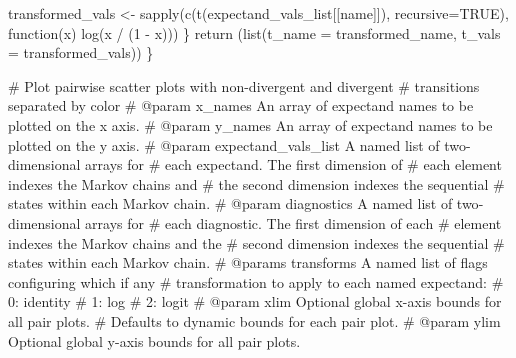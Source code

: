 \documentclass[
  letterpaper,
  DIV=11,
  numbers=noendperiod]{scrartcl}
\newenvironment{Shaded}{\begin{snugshade}}{\end{snugshade}}
\newcommand{\BuiltInTok}[1]{\textcolor[rgb]{0.00,0.23,0.31}{#1}}
\newcommand{\CommentTok}[1]{\textcolor[rgb]{0.37,0.37,0.37}{#1}}
\newcommand{\ControlFlowTok}[1]{\textcolor[rgb]{0.00,0.23,0.31}{#1}}
\newcommand{\DecValTok}[1]{\textcolor[rgb]{0.68,0.00,0.00}{#1}}
\newcommand{\NormalTok}[1]{\textcolor[rgb]{0.00,0.23,0.31}{#1}}
\newcommand{\OperatorTok}[1]{\textcolor[rgb]{0.37,0.37,0.37}{#1}}
\newcommand{\StringTok}[1]{\textcolor[rgb]{0.13,0.47,0.30}{#1}}
\begin{document}
\begin{Shaded}
\begin{Highlighting}[]
\NormalTok{    transformed\_vals }\OperatorTok{\textless{}{-}}\NormalTok{ sapply(c(t(expectand\_vals\_list[[name]]),}
\NormalTok{                                 recursive}\OperatorTok{=}\NormalTok{TRUE),}
\NormalTok{                               function(x) log(x }\OperatorTok{/}\NormalTok{ (}\DecValTok{1} \OperatorTok{{-}}\NormalTok{ x)))}
\NormalTok{  \}}
  \ControlFlowTok{return}\NormalTok{ (}\BuiltInTok{list}\NormalTok{(}\StringTok{\textquotesingle{}t\_name\textquotesingle{}} \OperatorTok{=}\NormalTok{ transformed\_name, }
               \StringTok{\textquotesingle{}t\_vals\textquotesingle{}} \OperatorTok{=}\NormalTok{ transformed\_vals))}
\NormalTok{\}}
\end{Highlighting}
\end{Shaded}

\begin{Shaded}
\begin{Highlighting}[]
\CommentTok{\# Plot pairwise scatter plots with non{-}divergent and divergent }
\CommentTok{\# transitions separated by color}
\CommentTok{\# @param x\_names An array of expectand names to be plotted on the x axis.}
\CommentTok{\# @param y\_names An array of expectand names to be plotted on the y axis.}
\CommentTok{\# @param expectand\_vals\_list A named list of two{-}dimensional arrays for}
\CommentTok{\#                            each expectand.  The first dimension of}
\CommentTok{\#                            each element indexes the Markov chains and}
\CommentTok{\#                            the second dimension indexes the sequential}
\CommentTok{\#                            states within each Markov chain.}
\CommentTok{\# @param diagnostics A named list of two{-}dimensional arrays for }
\CommentTok{\#                    each diagnostic.  The first dimension of each}
\CommentTok{\#                    element indexes the Markov chains and the }
\CommentTok{\#                    second dimension indexes the sequential }
\CommentTok{\#                    states within each Markov chain.}
\CommentTok{\# @params transforms A named list of flags configuring which if any}
\CommentTok{\#                    transformation to apply to each named expectand:}
\CommentTok{\#                      0: identity}
\CommentTok{\#                      1: log}
\CommentTok{\#                      2: logit}
\CommentTok{\# @param xlim       Optional global x{-}axis bounds for all pair plots.}
\CommentTok{\#                   Defaults to dynamic bounds for each pair plot.}
\CommentTok{\# @param ylim       Optional global y{-}axis bounds for all pair plots.}

\end{Highlighting}
\end{Shaded}
\end{document}
